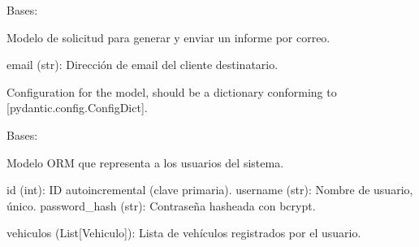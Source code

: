 \documentclass[letterpaper,10pt,spanish]{sphinxmanual}
\begin{document}
\begin{fulllineitems}
\label{\detokenize{modelos:main.InformeRequest}}
\pysigstartsignatures
\pysiglinewithargsret
{}
{\sphinxparamcomma {}}
{}
\pysigstopsignatures
\sphinxAtStartPar
Bases: 

\sphinxAtStartPar
Modelo de solicitud para generar y enviar un informe por correo.
\begin{description}
\sphinxAtStartPar
email (str): Dirección de email del cliente destinatario.

\end{description}

\begin{fulllineitems}
\label{\detokenize{modelos:main.InformeRequest.model_config}}
\pysigstartsignatures
\pysigline
{}
\pysigstopsignatures
\sphinxAtStartPar
Configuration for the model, should be a dictionary conforming to {[}\sphinxtitleref{ConfigDict}{]}{[}pydantic.config.ConfigDict{]}.

\end{fulllineitems}


\end{fulllineitems}


\begin{fulllineitems}
\label{\detokenize{modelos:main.Usuario}}
\pysigstartsignatures
\pysiglinewithargsret
{}
{}
{}
\pysigstopsignatures
\sphinxAtStartPar
Bases: {\hyperref[\detokenize{modelos:main.Base}]{}}

\sphinxAtStartPar
Modelo ORM que representa a los usuarios del sistema.
\begin{description}
\sphinxAtStartPar
id (int): ID autoincremental (clave primaria).
username (str): Nombre de usuario, único.
password\_hash (str): Contraseña hasheada con bcrypt.

\sphinxAtStartPar
vehiculos (List{[}Vehiculo{]}): Lista de vehículos registrados por el usuario.

\end{description}

\end{fulllineitems}
\end{document}
